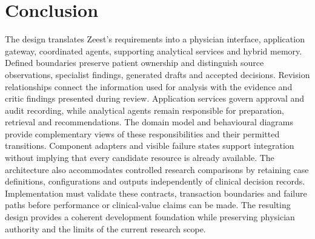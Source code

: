 \section{Conclusion}

The design translates Zeest's requirements into a physician interface, application gateway, coordinated agents, supporting analytical services and hybrid memory. Defined boundaries preserve patient ownership and distinguish source observations, specialist findings, generated drafts and accepted decisions. Revision relationships connect the information used for analysis with the evidence and critic findings presented during review. Application services govern approval and audit recording, while analytical agents remain responsible for preparation, retrieval and recommendations. The domain model and behavioural diagrams provide complementary views of these responsibilities and their permitted transitions. Component adapters and visible failure states support integration without implying that every candidate resource is already available. The architecture also accommodates controlled research comparisons by retaining case definitions, configurations and outputs independently of clinical decision records. Implementation must validate these contracts, transaction boundaries and failure paths before performance or clinical-value claims can be made. The resulting design provides a coherent development foundation while preserving physician authority and the limits of the current research scope.

\endgroup
